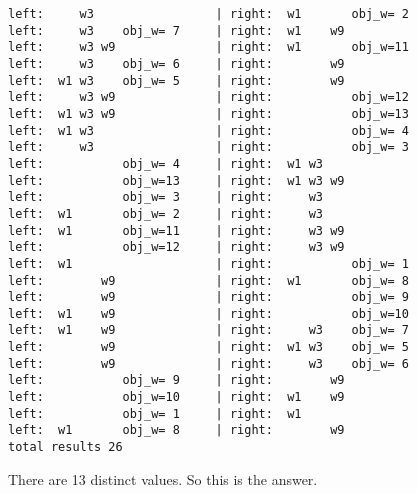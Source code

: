 \begin{lstlisting}
left:     w3                 | right:  w1       obj_w= 2
left:     w3    obj_w= 7     | right:  w1    w9
left:     w3 w9              | right:  w1       obj_w=11
left:     w3    obj_w= 6     | right:        w9
left:  w1 w3    obj_w= 5     | right:        w9
left:     w3 w9              | right:           obj_w=12
left:  w1 w3 w9              | right:           obj_w=13
left:  w1 w3                 | right:           obj_w= 4
left:     w3                 | right:           obj_w= 3
left:           obj_w= 4     | right:  w1 w3
left:           obj_w=13     | right:  w1 w3 w9
left:           obj_w= 3     | right:     w3
left:  w1       obj_w= 2     | right:     w3
left:  w1       obj_w=11     | right:     w3 w9
left:           obj_w=12     | right:     w3 w9
left:  w1                    | right:           obj_w= 1
left:        w9              | right:  w1       obj_w= 8
left:        w9              | right:           obj_w= 9
left:  w1    w9              | right:           obj_w=10
left:  w1    w9              | right:     w3    obj_w= 7
left:        w9              | right:  w1 w3    obj_w= 5
left:        w9              | right:     w3    obj_w= 6
left:           obj_w= 9     | right:        w9
left:           obj_w=10     | right:  w1    w9
left:           obj_w= 1     | right:  w1
left:  w1       obj_w= 8     | right:        w9
total results 26
\end{lstlisting}

There are 13 distinct  values. So this is the answer.

